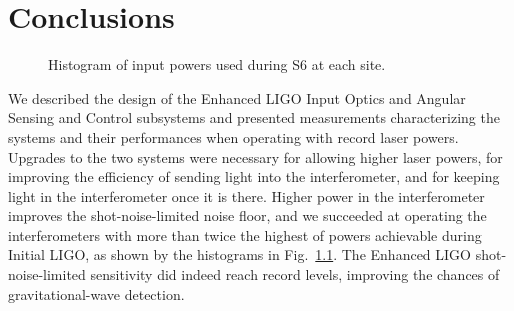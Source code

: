 \chapter{Conclusions}

\begin{figure}
\begin{centering}
\caption[Histogram of input powers used during S6]{Histogram of input
  powers used during S6 at each site.}
\label{fig:S6pwrs}
\end{centering}
\end{figure}

We described the design of the Enhanced LIGO Input Optics and Angular
Sensing and Control subsystems and presented measurements
characterizing the systems and their performances when operating with
record laser powers. Upgrades to the two systems were necessary for
allowing higher laser powers, for improving the efficiency of sending
light into the interferometer, and for keeping light in the
interferometer once it is there. Higher power in the interferometer
improves the shot-noise-limited noise floor, and we succeeded at
operating the interferometers with more than twice the highest of
powers achievable during Initial LIGO, as shown by the histograms in
Fig.~\ref{fig:S6pwrs}. The Enhanced LIGO shot-noise-limited
sensitivity did indeed reach record levels, improving the chances
of gravitational-wave detection.

